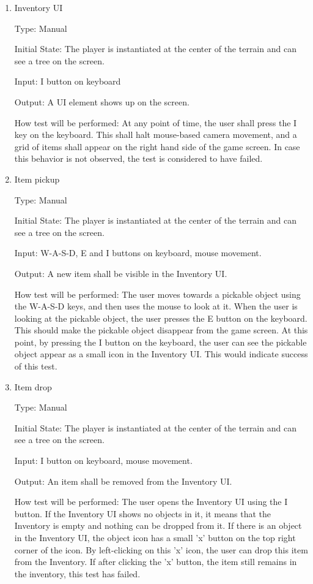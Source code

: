 \documentclass[12pt, titlepage]{article}
\begin{document}
\begin{enumerate}
	
\item{Inventory UI\\}

Type: Manual

Initial State: The player is instantiated at the center of the terrain and can see a tree on the screen.

Input: I button on keyboard

Output: A UI element shows up on the screen.

How test will be performed:
At any point of time, the user shall press the I key on the keyboard. This shall halt mouse-based camera movement, and a grid of items shall appear on the right hand side of the game screen. In case this behavior is not observed, the test is considered to have failed.

\item{Item pickup\\}

Type: Manual

Initial State: The player is instantiated at the center of the terrain and can see a tree on the screen.

Input: W-A-S-D, E and I buttons on keyboard, mouse movement.

Output: A new item shall be visible in the Inventory UI.

How test will be performed:
The user moves towards a pickable object using the W-A-S-D keys, and then uses the mouse to look at it. When the user is looking at the pickable object, the user presses the E button on the keyboard. This should make the pickable object disappear from the game screen. At this point, by pressing the I button on the keyboard, the user can see the pickable object appear as a small icon in the Inventory UI. This would indicate success of this test.

\item{Item drop\\}

Type: Manual

Initial State: The player is instantiated at the center of the terrain and can see a tree on the screen.

Input: I button on keyboard, mouse movement.

Output: An item shall be removed from the Inventory UI.

How test will be performed:
The user opens the Inventory UI using the I button. If the Inventory UI shows no objects in it, it means that the Inventory is empty and nothing can be dropped from it. If there is an object in the Inventory UI, the object icon has a small 'x' button on the top right corner of the icon. By left-clicking on this 'x' icon, the user can drop this item from the Inventory. If after clicking the 'x' button, the item still remains in the inventory, this test has failed.


\end{enumerate}
\end{document}
